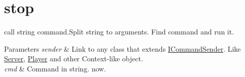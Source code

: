 \hypertarget{stop-example}{\section{stop}
}
call string command.\-Split string to arguments. Find command and run it.


\begin{DoxyParams}{Parameters}
{\em sender} & Link to any class that extends \hyperlink{class_i_command_sender}{I\-Command\-Sender}. Like \hyperlink{class_server}{Server}, \hyperlink{class_player}{Player} and other Context-\/like object. \\
\hline
{\em cmd} & Command in string. now.\\
\hline
\end{DoxyParams}

\begin{DoxyCodeInclude}
\end{DoxyCodeInclude}
 